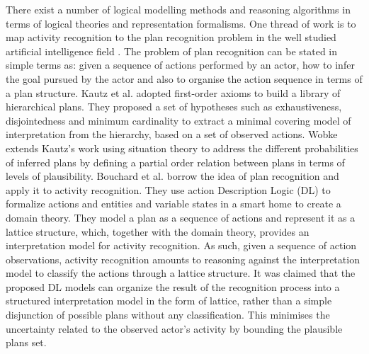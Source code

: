 There exist a number of logical modelling methods and reasoning algorithms in terms of logical theories and representation formalisms. One thread of work is to map activity recognition to the plan recognition problem in the well studied artificial intelligence field \cite{Carberry2001}. The problem of plan recognition can be stated in simple terms as: given a sequence of actions performed by an actor, how to infer the goal pursued by the actor and also to organise the action sequence in terms of a plan structure. Kautz et al. \cite{Kautz1991} adopted first-order axioms to build a library of hierarchical plans. They proposed a set of hypotheses such as exhaustiveness, disjointedness and minimum cardinality to extract a minimal covering model of interpretation from the hierarchy, based on a set of observed actions. Wobke \cite{Wobcke2002} extends Kautz’s work using situation theory to address the different probabilities of inferred plans by defining a partial order relation between plans in terms of levels of plausibility. Bouchard et al. \cite{Bouchard2006} borrow the idea of plan recognition and apply it to activity recognition. They use action Description Logic (DL) to formalize actions and entities and variable states in a smart home to create a domain theory. They model a plan as a sequence of actions and represent it as a lattice structure, which, together with the domain theory, provides an interpretation model for activity recognition. As such, given a sequence of action observations, activity recognition amounts to reasoning against the interpretation model to classify the actions through a lattice structure. It was claimed that the proposed DL models can organize the result of the recognition process into a structured interpretation model in the form of lattice, rather than a simple disjunction of possible plans without any classification. This minimises the uncertainty related to the observed actor’s activity by bounding the plausible plans set.

